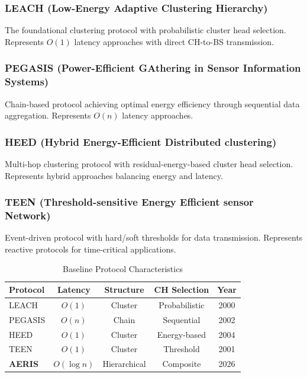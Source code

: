 \subsubsection{LEACH (Low-Energy Adaptive Clustering Hierarchy)}

The foundational clustering protocol \cite{heinzelman2000leach} with
probabilistic cluster head selection. Represents $O(1)$ latency approaches
with direct CH-to-BS transmission.

\subsubsection{PEGASIS (Power-Efficient GAthering in Sensor Information Systems)}

Chain-based protocol \cite{lindsey2002pegasis} achieving optimal energy
efficiency through sequential data aggregation. Represents $O(n)$ latency
approaches.

\subsubsection{HEED (Hybrid Energy-Efficient Distributed clustering)}

Multi-hop clustering protocol \cite{younis2004heed} with residual-energy-based
cluster head selection. Represents hybrid approaches balancing energy and
latency.

\subsubsection{TEEN (Threshold-sensitive Energy Efficient sensor Network)}

Event-driven protocol \cite{manjeshwar2001teen} with hard/soft thresholds
for data transmission. Represents reactive protocols for time-critical
applications.

\begin{table}[htbp]
\centering
\caption{Baseline Protocol Characteristics}
\label{tab:baseline_chars}
\begin{tabular}{@{}lcccc@{}}
\toprule
Protocol & Latency & Structure & CH Selection & Year \\
\midrule
LEACH & $O(1)$ & Cluster & Probabilistic & 2000 \\
PEGASIS & $O(n)$ & Chain & Sequential & 2002 \\
HEED & $O(1)$ & Cluster & Energy-based & 2004 \\
TEEN & $O(1)$ & Cluster & Threshold & 2001 \\
\textbf{AERIS} & $O(\log n)$ & Hierarchical & Composite & 2026 \\
\bottomrule
\end{tabular}
\end{table}

